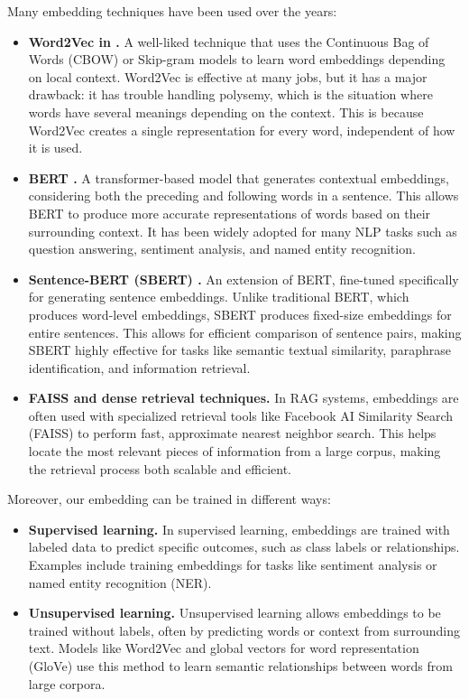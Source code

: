 Many embedding techniques have been used over the years:
\begin{itemize}
    \item \textbf{Word2Vec in  \cite{mikolov2013efficient}.} A well-liked technique that uses the Continuous Bag of Words (CBOW) or Skip-gram models to learn word embeddings depending on local context. Word2Vec is effective at many jobs, but it has a major drawback: it has trouble handling polysemy, which is the situation where words have several meanings depending on the context. This is because Word2Vec creates a single representation for every word, independent of how it is used.

    \item \textbf{BERT \cite{devlin2019bert}.} A transformer-based model that generates contextual embeddings, considering both the preceding and following words in a sentence. This allows BERT to produce more accurate representations of words based on their surrounding context. It has been widely adopted for many NLP tasks such as question answering, sentiment analysis, and named entity recognition.

    \item \textbf{Sentence-BERT (SBERT) \cite{reimers-2019-sentence-bert}.} An extension of BERT, fine-tuned specifically for generating sentence embeddings. Unlike traditional BERT, which produces word-level embeddings, SBERT produces fixed-size embeddings for entire sentences. This allows for efficient comparison of sentence pairs, making SBERT highly effective for tasks like semantic textual similarity, paraphrase identification, and information retrieval.

    \item \textbf{FAISS \cite{douze2024faiss} and dense retrieval techniques.} In RAG systems, embeddings are often used with specialized retrieval tools like Facebook AI Similarity Search (FAISS) to perform fast, approximate nearest neighbor search. This helps locate the most relevant pieces of information from a large corpus, making the retrieval process both scalable and efficient.
\end{itemize}


Moreover, our embedding can be trained in different ways: 
\begin{itemize}
    \item \textbf{Supervised learning.} In supervised learning, embeddings are trained with labeled data to predict specific outcomes, such as class labels or relationships. Examples include training embeddings for tasks like sentiment analysis or named entity recognition (NER).
    \item \textbf{Unsupervised learning.} Unsupervised learning allows embeddings to be trained without labels, often by predicting words or context from surrounding text. Models like Word2Vec and global vectors for word representation (GloVe) \cite{Pennington2014GloVeGV} use this method to learn semantic relationships between words from large corpora.
   
\end{itemize}

